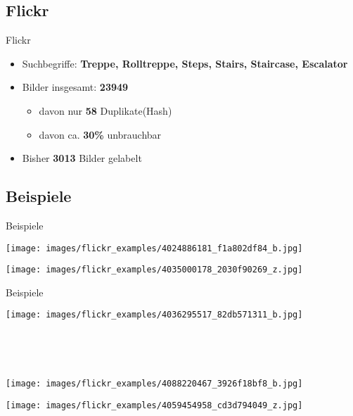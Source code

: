 \documentclass[18pt]{beamer}
\begin{document}
\subsection{Flickr}
\begin{frame}{Flickr}
\begin{itemize}
	\item Suchbegriffe: \textbf{Treppe, Rolltreppe, Steps, Stairs, Staircase, Escalator}
	\item Bilder insgesamt: \textbf{23949}
	\begin{itemize}
		\item davon nur \textbf{58} Duplikate(Hash)
		\item davon ca. \textbf{30\%} unbrauchbar
	\end{itemize}
	\item Bisher \textbf{3013} Bilder gelabelt
\end{itemize}
\end{frame}

\subsection{Beispiele}
\begin{frame}{Beispiele}
\begin{minipage}[c]{0.4\textwidth}
	\texttt{[image: images/flickr\_examples/4024886181\_f1a802df84\_b.jpg]}
\end{minipage}
\begin{minipage}[c]{0.18\textwidth}
	\hfill
\end{minipage}
\begin{minipage}[c]{0.4\textwidth}
	\texttt{[image: images/flickr\_examples/4035000178\_2030f90269\_z.jpg]}
\end{minipage}
\end{frame}

\begin{frame}{Beispiele}
\begin{minipage}[c]{0.4\textwidth}
	\begin{minipage}[c]{0.4\textwidth}
		\texttt{[image: images/flickr\_examples/4036295517\_82db571311\_b.jpg]}
	\end{minipage}\\
	\begin{minipage}[c]{0.18\textwidth}
		\vfill
	\end{minipage}\\
	\begin{minipage}[c]{0.4\textwidth}
		\texttt{[image: images/flickr\_examples/4088220467\_3926f18bf8\_b.jpg]}
	\end{minipage}
\end{minipage}
\begin{minipage}[c]{0.14\textwidth}
	\hfill
\end{minipage}	
\begin{minipage}[c]{0.4\textwidth}
	\texttt{[image: images/flickr\_examples/4059454958\_cd3d794049\_z.jpg]}
\end{minipage}
\end{frame}
\end{document}
